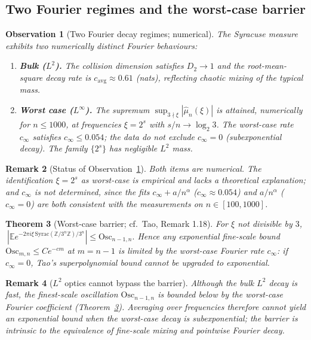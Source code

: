 \documentclass[12pt,a4paper]{article}
\newtheorem{theorem}{Theorem}[section]
\newtheorem{remark}[theorem]{Remark}
\newtheorem{observation}[theorem]{Observation}
\begin{document}
\subsection{Two Fourier regimes and the worst-case barrier}

\begin{observation}[Two Fourier decay regimes; numerical]
\label{obs:two_regimes}
The Syracuse measure exhibits two numerically distinct Fourier behaviours:
\begin{enumerate}
\item[(i)] \textbf{Bulk ($L^2$).} The collision dimension satisfies $D_2\to1$ and
the root-mean-square decay rate is $c_{\mathrm{avg}}\approx0.61$ (nats),
reflecting chaotic mixing of the typical mass.
\item[(ii)] \textbf{Worst case ($L^\infty$).} The supremum
$\sup_{3\nmid\xi}|\hat\mu_n(\xi)|$ is attained, numerically for $n\le1000$, at
frequencies $\xi=2^s$ with $s/n\to\log_2 3$. The worst-case rate $c_\infty$
satisfies $c_\infty\le0.054$; the data do not exclude $c_\infty=0$
(subexponential decay). The family $\{2^s\}$ has negligible $L^2$ mass.
\end{enumerate}
\end{observation}

\begin{remark}[Status of Observation~\ref{obs:two_regimes}]
Both items are numerical. The identification $\xi=2^s$ as worst-case is
empirical and lacks a theoretical explanation; and $c_\infty$ is not
determined, since the fits $c_\infty+a/n^\alpha$ ($c_\infty\approx0.054$) and
$a/n^\alpha$ ($c_\infty=0$) are both consistent with the measurements on
$n\in[100,1000]$.
\end{remark}

\begin{theorem}[Worst-case barrier; cf.\ Tao, Remark 1.18]
\label{thm:barrier}
For $\xi$ not divisible by $3$,
$\ |\mathbb E e^{-2\pi i\xi\,\mathrm{Syrac}(\mathbb Z/3^n\mathbb Z)/3^n}|
\le\mathrm{Osc}_{n-1,n}.$
Hence any exponential fine-scale bound $\mathrm{Osc}_{m,n}\le Ce^{-cm}$ at
$m=n-1$ is limited by the worst-case Fourier rate $c_\infty$: if $c_\infty=0$,
Tao's superpolynomial bound cannot be upgraded to exponential.
\end{theorem}

\begin{remark}[$L^2$ optics cannot bypass the barrier]
Although the bulk $L^2$ decay is fast, the finest-scale oscillation
$\mathrm{Osc}_{n-1,n}$ is bounded \emph{below} by the worst-case Fourier
coefficient (Theorem~\ref{thm:barrier}). Averaging over frequencies therefore
cannot yield an exponential bound when the worst-case decay is subexponential;
the barrier is intrinsic to the equivalence of fine-scale mixing and pointwise
Fourier decay.
\end{remark}
\end{document}
